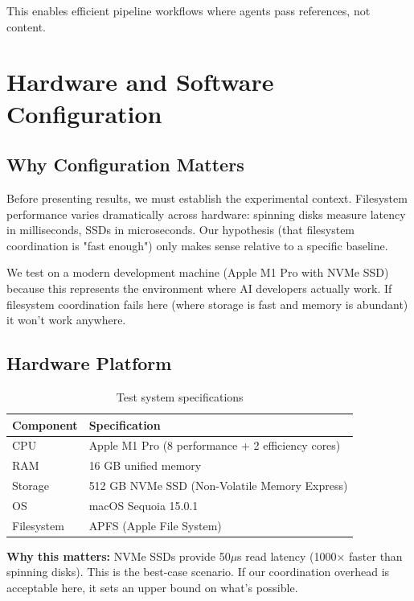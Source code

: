 \documentclass[11pt]{article}
\begin{document}
This enables efficient pipeline workflows where agents pass references, not content.

\section{Hardware and Software Configuration}

\subsection{Why Configuration Matters}

Before presenting results, we must establish the experimental context. Filesystem performance varies dramatically across hardware: spinning disks measure latency in milliseconds, SSDs in microseconds. Our hypothesis (that filesystem coordination is "fast enough") only makes sense relative to a specific baseline.

We test on a modern development machine (Apple M1 Pro with NVMe SSD) because this represents the environment where AI developers actually work. If filesystem coordination fails here (where storage is fast and memory is abundant) it won't work anywhere.

\subsection{Hardware Platform}

\begin{table}[h]
\centering
\begin{tabular}{ll}
\toprule
\textbf{Component} & \textbf{Specification} \\
\midrule
CPU & Apple M1 Pro (8 performance + 2 efficiency cores) \\
RAM & 16 GB unified memory \\
Storage & 512 GB NVMe SSD (Non-Volatile Memory Express) \\
OS & macOS Sequoia 15.0.1 \\
Filesystem & APFS (Apple File System) \\
\bottomrule
\end{tabular}
\caption{Test system specifications}
\end{table}

\textbf{Why this matters:} NVMe SSDs provide 50$\mu$s read latency (1000× faster than spinning disks). This is the best-case scenario. If our coordination overhead is acceptable here, it sets an upper bound on what's possible.
\end{document}
